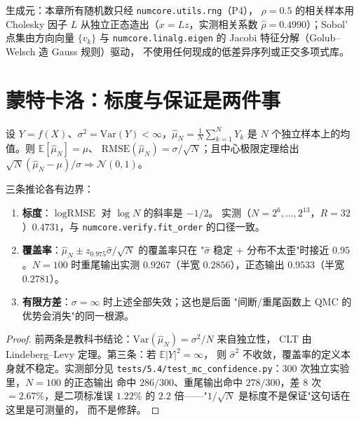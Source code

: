 生成元：本章所有随机数只经 \texttt{numcore.utils.rng}（P4），
$\rho=0.5$ 的相关样本用 Cholesky 因子 $L$ 从独立正态造出（$x=Lz$，实测相关系数
$\hat\rho=0.4990$）；Sobol' 点集由方向向量 $\{v_k\}$ 与
\texttt{numcore.linalg.eigen} 的 Jacobi 特征分解（Golub--Welsch 造 Gauss 规则）驱动，
不使用任何现成的低差异序列或正交多项式库。

\section{蒙特卡洛：标度与保证是两件事}\label{sec:mc}

\begin{theorem}[蒙特卡洛误差的标度与它的三个前提]\label{thm:mc}
设 $Y=f(X)$、$\sigma^2=\mathrm{Var}(Y)<\infty$，$\hat\mu_N=\frac1N\sum_{k=1}^NY_k$ 是
$N$ 个独立样本上的均值。则 $\mathbb{E}[\hat\mu_N]=\mu$、
$\mathrm{RMSE}(\hat\mu_N)=\sigma/\sqrt N$；且中心极限定理给出
$\sqrt N(\hat\mu_N-\mu)/\sigma\Rightarrow\mathcal N(0,1)$。

三条推论各有边界：
\begin{enumerate}
  \item \textbf{标度}：$\log\text{RMSE}$ 对 $\log N$ 的斜率是 $-1/2$。
        实测（$N=2^6,\dots,2^{13}$，$R=32$）$0.4731$，与
        \texttt{numcore.verify.fit\_order} 的口径一致。
  \item \textbf{覆盖率}：$\hat\mu_N\pm z_{0.975}\hat\sigma/\sqrt N$ 的覆盖率只在
        "$\hat\sigma$ 稳定 + 分布不太歪"时接近 $0.95$。$N=100$ 时重尾输出实测
        $0.9267$（半宽 $0.2856$），正态输出 $0.9533$（半宽 $0.2781$）。
  \item \textbf{有限方差}：$\sigma=\infty$ 时上述全部失效；这也是后面
        "间断/重尾函数上 QMC 的优势会消失"的同一根源。
\end{enumerate}
\end{theorem}

\begin{proof}
前两条是教科书结论：$\mathrm{Var}(\hat\mu_N)=\sigma^2/N$ 来自独立性，
CLT 由 Lindeberg--Levy 定理。第三条：若 $\mathbb{E}\lvert Y\rvert^2=\infty$，
则 $\hat\sigma^2$ 不收敛，覆盖率的定义本身就不稳定。实测部分见
\texttt{tests/5.4/test\_mc\_confidence.py}：300 次独立实验里，$N=100$ 的正态输出
命中 $286/300$、重尾输出命中 $278/300$，差 $8$ 次 $=2.67\%$，是二项标准误
$1.22\%$ 的 $2.2$ 倍——"$1/\sqrt N$ 是标度不是保证"这句话在这里是可测量的，
而不是修辞。
\end{proof}

